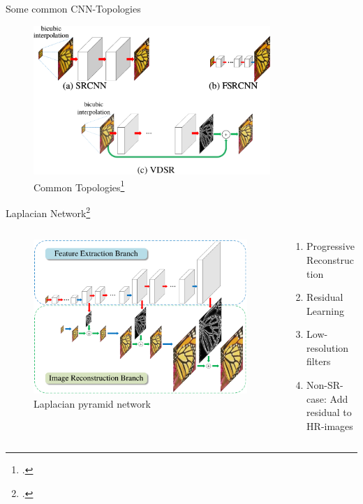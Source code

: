 \documentclass{beamer}
\begin{document}
\begin{frame}{Some common CNN-Topologies}
  \begin{figure}[h]
    \centering
    \includegraphics[width=0.8\textwidth]{sr_architectures.png}
    \caption*{Common Topologies\footcite{LapSRN}}
    \label{fig:topologies-cnn}
  \end{figure}
\end{frame}

\begin{frame}{Laplacian Network\footcite{LapSRN}}
\begin{columns}
\begin{column}{0.66\textwidth}
  \begin{figure}[h]
    \centering
    \includegraphics[width=1.0\textwidth]{lap_srn.png}
    \caption*{Laplacian pyramid network}
    \label{fig:lap-srn}
  \end{figure}
\end{column}

\begin{column}{0.34\textwidth}
  \begin{enumerate}
  \item Progressive Reconstruction
  \item Residual Learning
  \item Low-resolution filters
  \item Non-SR-case: Add residual to HR-images
  \end{enumerate}
\end{column}
\end{columns}
\end{frame}
\end{document}
